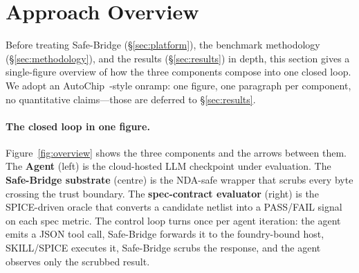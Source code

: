 
\section{Approach Overview}
\label{sec:overview}

Before treating Safe-Bridge (\S\ref{sec:platform}), the benchmark
methodology (\S\ref{sec:methodology}), and the results
(\S\ref{sec:results}) in depth, this section gives a single-figure
overview of how the three components compose into one closed loop.
We adopt an AutoChip~\cite{autochip}-style onramp: one figure, one
paragraph per component, no quantitative claims---those are
deferred to \S\ref{sec:results}.

\paragraph{The closed loop in one figure.}
Figure~\ref{fig:overview} shows the three components and the arrows
between them. The \textbf{Agent} (left) is the cloud-hosted LLM
checkpoint under evaluation. The \textbf{Safe-Bridge substrate}
(centre) is the NDA-safe wrapper that scrubs every byte crossing
the trust boundary. The \textbf{spec-contract evaluator} (right) is
the SPICE-driven oracle that converts a candidate netlist into a
PASS/FAIL signal on each spec metric. The control loop turns once
per agent iteration: the agent emits a JSON tool call, Safe-Bridge
forwards it to the foundry-bound host, SKILL/SPICE executes it,
Safe-Bridge scrubs the response, and the agent observes only the
scrubbed result.

